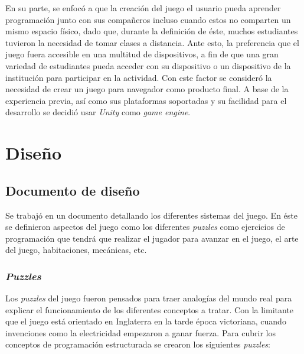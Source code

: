 En su parte, se enfocó a que la creación del juego el usuario pueda aprender programación junto con sus compañeros incluso cuando estos no comparten un mismo espacio físico, dado que, durante la definición de éste, muchos estudiantes tuvieron la necesidad de tomar clases a distancia. Ante esto, la preferencia que el juego fuera accesible en una multitud de dispositivos, a fin de que una gran variedad de estudiantes pueda acceder con su dispositivo o un dispositivo de la institución para participar en la actividad. Con este factor se consideró la necesidad de crear un juego para navegador como producto final. A base de la experiencia previa, así como sus plataformas soportadas y su facilidad para el desarrollo se decidió usar \textit{Unity} como \textit{game engine}.

\section{Diseño}
\subsection{Documento de diseño}
Se trabajó en un documento detallando los diferentes sistemas del juego. En éste se definieron aspectos del juego como los diferentes \textit{puzzles} como ejercicios de programación que tendrá que realizar el jugador para avanzar en el juego, el arte del juego, habitaciones, mecánicas, etc.

\subsubsection{\textit{Puzzles}}
Los \textit{puzzles} del juego fueron pensados para traer analogías del mundo real para explicar el funcionamiento de los diferentes conceptos a tratar. Con la limitante que el juego está orientado en Inglaterra en la tarde época victoriana, cuando invenciones como la electricidad empezaron a ganar fuerza.
Para cubrir los conceptos de programación estructurada se crearon los siguientes \textit{puzzles}:


